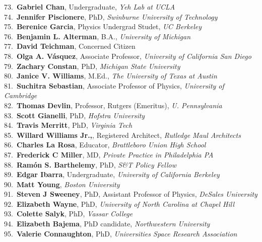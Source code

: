 73.~{\bf Gabriel Chan}, Undergraduate, {\sl Yeh Lab at UCLA} \\
74.~{\bf Jennifer Piscionere}, PhD, {\sl Swinburne University of Technology} \\
75.~{\bf Berenice Garcia}, Physics Undergrad Studet, {\sl UC Berkeley} \\
76.~{\bf Benjamin L. Alterman}, B.A., {\sl University of Michigan } \\
77.~{\bf David Teichman}, Concerned Citizen \\
78.~{\bf Olga A. V\'{a}squez}, Associate Professor, {\sl University of California San Diego} \\
79.~{\bf Zachary Constan}, PhD, {\sl Michigan State University } \\
80.~{\bf Janice V. Williams}, M.Ed., {\sl The University of Texas at Austin} \\
81.~{\bf Suchitra Sebastian}, Associate Professor of Physics, {\sl University of Cambridge} \\
82.~{\bf Thomas Devlin}, Professor, Rutgers (Emeritus), {\sl U. Pennsylvania} \\
83.~{\bf Scott Gianelli}, PhD, {\sl Hofstra University} \\
84.~{\bf Travis Merritt}, PhD, {\sl Virginia Tech} \\
85.~{\bf Willard Williams Jr.,}, Registered Architect, {\sl Rutledge Maul Architects} \\
86.~{\bf Charles La Rosa}, Educator, {\sl Brattleboro Union High School} \\
87.~{\bf Frederick C Miller}, MD, {\sl Private Practice in Philadelphia PA} \\
88.~{\bf Ram\'{o}n S. Barthelemy}, PhD, {\sl S\&T Policy Fellow} \\
89.~{\bf Edgar Ibarra}, Undergraduate, {\sl University of California Berkeley } \\
90.~{\bf Matt Young}, {\sl Boston University} \\
91.~{\bf Steven J Sweeney}, PhD, Assistant Professor of Physics, {\sl DeSales University} \\
92.~{\bf Elizabeth Wayne}, PhD, {\sl University of North Carolina at Chapel Hill} \\
93.~{\bf Colette Salyk}, PhD, {\sl Vassar College} \\
94.~{\bf Elizabeth Bajema}, PhD candidate, {\sl Northwestern University} \\
95.~{\bf Valerie Connaughton}, PhD, {\sl Universities Space Research Association} \\
